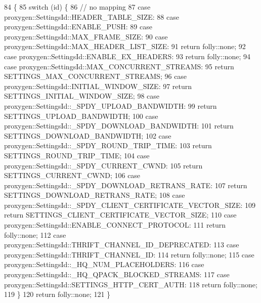 \begin{DoxyCode}
84                          \{
85   \textcolor{keywordflow}{switch} (\textcolor{keywordtype}{id}) \{
86     \textcolor{comment}{// no mapping}
87     \textcolor{keywordflow}{case} proxygen::SettingsId::HEADER_TABLE_SIZE:
88     \textcolor{keywordflow}{case} proxygen::SettingsId::ENABLE_PUSH:
89     \textcolor{keywordflow}{case} proxygen::SettingsId::MAX_FRAME_SIZE:
90     \textcolor{keywordflow}{case} proxygen::SettingsId::MAX_HEADER_LIST_SIZE:
91       \textcolor{keywordflow}{return} folly::none;
92     \textcolor{keywordflow}{case} proxygen::SettingsId::ENABLE_EX_HEADERS:
93       \textcolor{keywordflow}{return} folly::none;
94     \textcolor{keywordflow}{case} proxygen::SettingsId::MAX_CONCURRENT_STREAMS:
95       \textcolor{keywordflow}{return} SETTINGS_MAX_CONCURRENT_STREAMS;
96     \textcolor{keywordflow}{case} proxygen::SettingsId::INITIAL_WINDOW_SIZE:
97       \textcolor{keywordflow}{return} SETTINGS_INITIAL_WINDOW_SIZE;
98     \textcolor{keywordflow}{case} proxygen::SettingsId::_SPDY_UPLOAD_BANDWIDTH:
99       \textcolor{keywordflow}{return} SETTINGS_UPLOAD_BANDWIDTH;
100     \textcolor{keywordflow}{case} proxygen::SettingsId::_SPDY_DOWNLOAD_BANDWIDTH:
101       \textcolor{keywordflow}{return} SETTINGS_DOWNLOAD_BANDWIDTH;
102     \textcolor{keywordflow}{case} proxygen::SettingsId::_SPDY_ROUND_TRIP_TIME:
103       \textcolor{keywordflow}{return} SETTINGS_ROUND_TRIP_TIME;
104     \textcolor{keywordflow}{case} proxygen::SettingsId::_SPDY_CURRENT_CWND:
105       \textcolor{keywordflow}{return} SETTINGS_CURRENT_CWND;
106     \textcolor{keywordflow}{case} proxygen::SettingsId::_SPDY_DOWNLOAD_RETRANS_RATE:
107       \textcolor{keywordflow}{return} SETTINGS_DOWNLOAD_RETRANS_RATE;
108     \textcolor{keywordflow}{case} proxygen::SettingsId::_SPDY_CLIENT_CERTIFICATE_VECTOR_SIZE:
109       \textcolor{keywordflow}{return} SETTINGS_CLIENT_CERTIFICATE_VECTOR_SIZE;
110     \textcolor{keywordflow}{case} proxygen::SettingsId::ENABLE_CONNECT_PROTOCOL:
111       \textcolor{keywordflow}{return} folly::none;
112     \textcolor{keywordflow}{case} proxygen::SettingsId::THRIFT_CHANNEL_ID_DEPRECATED:
113     \textcolor{keywordflow}{case} proxygen::SettingsId::THRIFT_CHANNEL_ID:
114       \textcolor{keywordflow}{return} folly::none;
115     \textcolor{keywordflow}{case} proxygen::SettingsId::_HQ_NUM_PLACEHOLDERS:
116     \textcolor{keywordflow}{case} proxygen::SettingsId::_HQ_QPACK_BLOCKED_STREAMS:
117     \textcolor{keywordflow}{case} proxygen::SettingsId::SETTINGS_HTTP_CERT_AUTH:
118       \textcolor{keywordflow}{return} folly::none;
119   \}
120   \textcolor{keywordflow}{return} folly::none;
121 \}
\end{DoxyCode}
